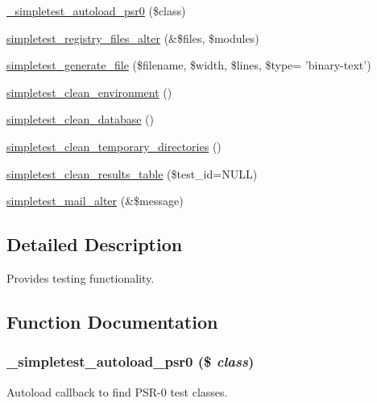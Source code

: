 \begin{DoxyCompactItemize}
\item 
\hyperlink{simpletest_8module_ac05fbf90b82a1bd04de56ebff9efff77}{\_\-simpletest\_\-autoload\_\-psr0} (\$class)
\item 
\hyperlink{simpletest_8module_a00dcdad5c7cce6aba550dfd1e24f6eec}{simpletest\_\-registry\_\-files\_\-alter} (\&\$files, \$modules)
\item 
\hyperlink{simpletest_8module_aebcb4a918f91dad598f8267982ef4756}{simpletest\_\-generate\_\-file} (\$filename, \$width, \$lines, \$type= 'binary-\/text')
\item 
\hyperlink{simpletest_8module_a73ef6e1e0bfea1443491cbbaa7037f8a}{simpletest\_\-clean\_\-environment} ()
\item 
\hyperlink{simpletest_8module_af60eb47f9c6c89840089128ae0eb8673}{simpletest\_\-clean\_\-database} ()
\item 
\hyperlink{simpletest_8module_a4be9d49870bfc35792cd9dc4dd1b389b}{simpletest\_\-clean\_\-temporary\_\-directories} ()
\item 
\hyperlink{simpletest_8module_a5219f838d43b69d755cd10e9b53011b9}{simpletest\_\-clean\_\-results\_\-table} (\$test\_\-id=NULL)
\item 
\hyperlink{simpletest_8module_a390f5b49a961ac363a4f469c50cae7c4}{simpletest\_\-mail\_\-alter} (\&\$message)
\end{DoxyCompactItemize}


\subsection{Detailed Description}
Provides testing functionality. 

\subsection{Function Documentation}
\hypertarget{simpletest_8module_ac05fbf90b82a1bd04de56ebff9efff77}{
\subsubsection[{\_\-simpletest\_\-autoload\_\-psr0}]{\setlength{\rightskip}{0pt plus 5cm}\_\-simpletest\_\-autoload\_\-psr0 (\$ {\em class})}}
\label{simpletest_8module_ac05fbf90b82a1bd04de56ebff9efff77}
Autoload callback to find PSR-\/0 test classes.

